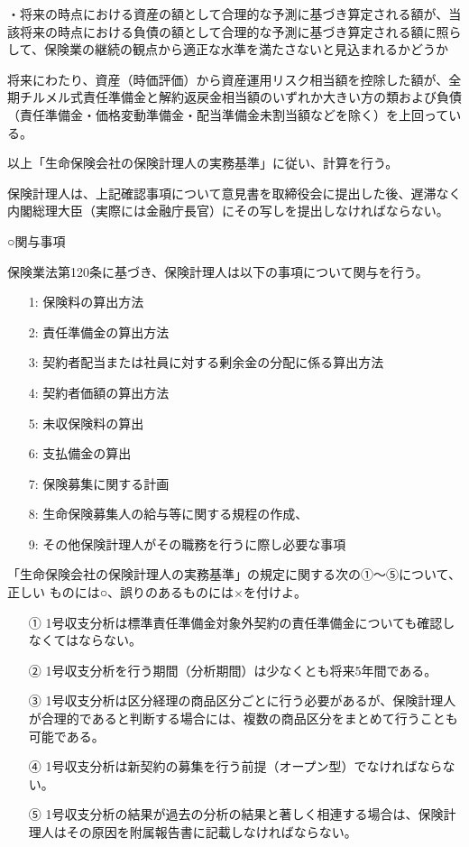 \documentclass[report,gutter=10mm,fore-edge=10mm,uplatex,dvipdfmx]{jlreq}
\begin{document}
・将来の時点における資産の額として合理的な予測に基づき算定される額が、当該将来の時点における負債の額として合理的な予測に基づき算定される額に照らして、保険業の継続の観点から適正な水準を満たさないと見込まれるかどうか

将来にわたり、資産（時価評価）から資産運用リスク相当額を控除した額が、全期チルメル式責任準備金と解約返戻金相当額のいずれか大きい方の類および負債（責任準備金・価格変動準備金・配当準備金未割当額などを除く）を上回っている。

以上「生命保険会社の保険計理人の実務基準」に従い、計算を行う。

保険計理人は、上記確認事項について意見書を取締役会に提出した後、遅滞なく内閣総理大臣（実際には金融庁長官）にその写しを提出しなければならない。

○関与事項

保険業法第120条に基づき、保険計理人は以下の事項について関与を行う。

\begin{itemize}
 \item[1: ] 保険料の算出方法
 \item[2: ] 責任準備金の算出方法
 \item[3: ] 契約者配当または社員に対する剰余金の分配に係る算出方法
 \item[4: ] 契約者価額の算出方法
 \item[5: ] 未収保険料の算出
 \item[6: ] 支払備金の算出
 \item[7: ] 保険募集に関する計画
 \item[8: ] 生命保険募集人の給与等に関する規程の作成、
 \item[9: ] その他保険計理人がその職務を行うに際し必要な事項
\end{itemize}

「生命保険会社の保険計理人の実務基準」の規定に関する次の①〜⑤について、正しい
ものには○、誤りのあるものには×を付けよ。

\begin{itemize}
\item[ ①] 1号収支分析は標準責任準備金対象外契約の責任準備金についても確認しなくてはならない。
\item[ ②] 1号収支分析を行う期間（分析期間）は少なくとも将来5年間である。
\item[ ③] 1号収支分析は区分経理の商品区分ごとに行う必要があるが、保険計理人が合理的であると判断する場合には、複数の商品区分をまとめて行うことも可能である。
\item[ ④] 1号収支分析は新契約の募集を行う前提（オープン型）でなければならない。
\item[ ⑤] 1号収支分析の結果が過去の分析の結果と著しく相連する場合は、保険計理人はその原因を附属報告書に記載しなければならない。
\end{itemize}
\end{document}
